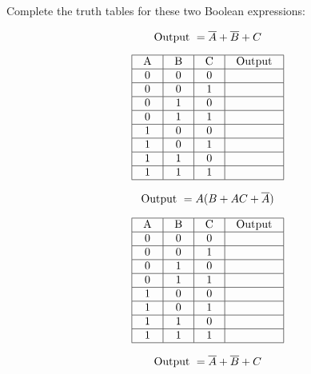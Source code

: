 

Complete the truth tables for these two Boolean expressions:

$$\hbox{Output } = \overline{A} + \overline{B} + C$$


$$\vbox{\offinterlineskip
\halign{\strut
\vrule \quad\hfil # \ \hfil & 
\vrule \quad\hfil # \ \hfil & 
\vrule \quad\hfil # \ \hfil & 
\vrule \quad\hfil # \ \hfil \vrule \cr
\noalign{\hrule}
%
A & B & C & Output \cr
%
\noalign{\hrule}
%
0 & 0 & 0 & \cr
%
\noalign{\hrule}
%
0 & 0 & 1 &  \cr
%
\noalign{\hrule}
%
0 & 1 & 0 &  \cr
%
\noalign{\hrule}
%
0 & 1 & 1 &  \cr
%
\noalign{\hrule}
%
1 & 0 & 0 &  \cr
%
\noalign{\hrule}
%
1 & 0 & 1 &  \cr
%
\noalign{\hrule}
%
1 & 1 & 0 &  \cr
%
\noalign{\hrule}
%
1 & 1 & 1 &  \cr
%
\noalign{\hrule}
} %
}$$ %


\vskip 20pt


$$\hbox{Output } = A(B + AC + \overline{A})$$

$$\vbox{\offinterlineskip
\halign{\strut
\vrule \quad\hfil # \ \hfil & 
\vrule \quad\hfil # \ \hfil & 
\vrule \quad\hfil # \ \hfil & 
\vrule \quad\hfil # \ \hfil \vrule \cr
\noalign{\hrule}
%
A & B & C & Output \cr
%
\noalign{\hrule}
%
0 & 0 & 0 & \cr
%
\noalign{\hrule}
%
0 & 0 & 1 &  \cr
%
\noalign{\hrule}
%
0 & 1 & 0 &  \cr
%
\noalign{\hrule}
%
0 & 1 & 1 &  \cr
%
\noalign{\hrule}
%
1 & 0 & 0 &  \cr
%
\noalign{\hrule}
%
1 & 0 & 1 &  \cr
%
\noalign{\hrule}
%
1 & 1 & 0 &  \cr
%
\noalign{\hrule}
%
1 & 1 & 1 &  \cr
%
\noalign{\hrule}
} %
}$$ %







$$\hbox{Output } = \overline{A} + \overline{B} + C$$


